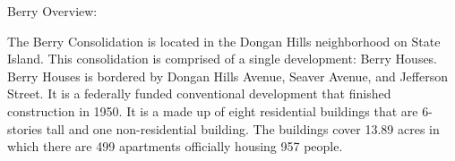 Berry Overview:       

     

The Berry Consolidation is located in the Dongan Hills neighborhood on State Island. This consolidation is comprised of a single development: Berry Houses. Berry Houses is bordered by Dongan Hills Avenue, Seaver Avenue, and Jefferson Street. It is a federally funded conventional development that finished construction in 1950. It is a made up of eight residential buildings that are 6- stories tall and one non-residential building. The buildings cover 13.89 acres in which there are 499 apartments officially housing 957 people.   

 